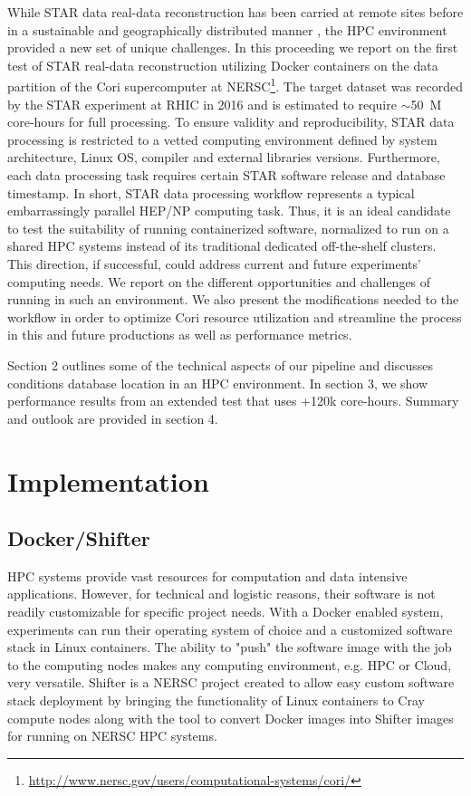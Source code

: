 \documentclass[a4paper]{jpconf}
\begin{document}
While STAR data real-data reconstruction has been carried at remote sites before in a sustainable and geographically distributed manner \cite{kisti}, the HPC environment provided a new set of unique challenges. In this proceeding we report on the first test of STAR real-data reconstruction
utilizing Docker \cite{docker} containers on the data partition of the Cori supercomputer at
NERSC\footnote{\url{http://www.nersc.gov/users/computational-systems/cori/}}. The
target dataset was recorded by the STAR experiment at RHIC in 2016
and is estimated to require $\sim$50~M core-hours for full processing. To ensure
validity and reproducibility, STAR data processing is restricted to a vetted
computing environment defined by system architecture, Linux OS, compiler and
external libraries versions.  Furthermore, each data processing task requires
certain STAR software release and database timestamp. In short, STAR data
processing workflow represents a typical embarrassingly parallel HEP/NP
computing task.  Thus, it is an ideal candidate to test the suitability of
running containerized software, normalized to run on a shared HPC systems
instead of its traditional dedicated off-the-shelf clusters. This direction, if
successful, could address current and future experiments' computing
needs. We report on the different opportunities and challenges of running in
such an environment.  We also present the modifications needed to the workflow
in order to optimize Cori resource utilization and streamline the process in
this and future productions as well as performance metrics.

Section 2 outlines some of the technical aspects of our pipeline and discusses
conditions database location in an HPC environment. In section 3,
we show performance results from an extended test that uses +120k core-hours.
Summary and outlook are provided in section 4. 

\section{Implementation}
\subsection{Docker/Shifter}
HPC systems provide vast resources for computation and data intensive
applications. However, for technical and logistic reasons, their software is
not readily customizable for specific project needs. With a Docker enabled
system, experiments can run their operating system of choice  and a customized
software stack in Linux containers.  The ability to "push" the software image
with the job to the computing nodes makes any computing environment, e.g. HPC
or Cloud, very versatile. Shifter \cite{shifter} is a NERSC project created to
allow easy custom software stack deployment by bringing the functionality of
Linux containers to Cray compute nodes along with the tool to convert Docker
images into Shifter images for running on NERSC HPC systems.
\end{document}
